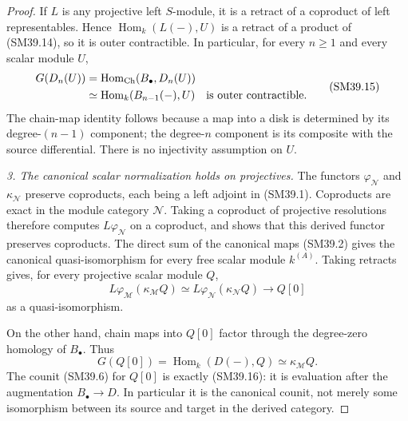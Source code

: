 \begin{proof}
If \(L\) is any projective left \(S\)-module, it is a
retract of a coproduct of left representables.  Hence
\(\operatorname{Hom}_k(L(-),U)\) is a retract of a product
of (SM39.14), so it is outer contractible.  In particular,
for every \(n\ge1\) and every scalar module \(U\),
\[
 \begin{aligned}
 G(D_n(U))
   &=\operatorname{Hom}_{\mathrm{Ch}}(B_\bullet,D_n(U))\\
   &\simeq\operatorname{Hom}_k(B_{n-1}(-),U)
                 \quad\hbox{is outer contractible}.
 \end{aligned}                                               \tag{SM39.15}
\]
The chain-map identity follows because a map into a disk
is determined by its degree-\((n-1)\) component; the
degree-\(n\) component is its composite with the source
differential.  There is no injectivity assumption on \(U\).

\emph{3. The canonical scalar normalization holds on projectives.}
The functors \(\varphi_{\mathcal N}\) and
\(\kappa_{\mathcal N}\) preserve coproducts, each being a
left adjoint in (SM39.1).  Coproducts are exact in the module
category \(\mathcal N\).  Taking a coproduct of projective
resolutions therefore computes \(L\varphi_{\mathcal N}\)
on a coproduct, and shows that this derived functor preserves
coproducts.  The direct sum of the canonical maps (SM39.2)
gives the canonical quasi-isomorphism for every free scalar
module \(k^{(A)}\).  Taking retracts gives, for every
projective scalar module \(Q\),
\[
       L\varphi_{\mathcal M}(\kappa_{\mathcal M}Q)
                \simeq L\varphi_{\mathcal N}(\kappa_{\mathcal N}Q)
                         \longrightarrow Q[0]               \tag{SM39.16}
\]
as a quasi-isomorphism.

On the other hand, chain maps into \(Q[0]\) factor through
the degree-zero homology of \(B_\bullet\).  Thus
\[
          G(Q[0])=\operatorname{Hom}_k(D(-),Q)
                         \simeq\kappa_{\mathcal M}Q.         \tag{SM39.17}
\]
The counit (SM39.6) for \(Q[0]\) is exactly (SM39.16):
it is evaluation after the augmentation \(B_\bullet\to D\).
In particular it is the canonical counit, not merely some
isomorphism between its source and target in the derived
category.


\end{proof}
